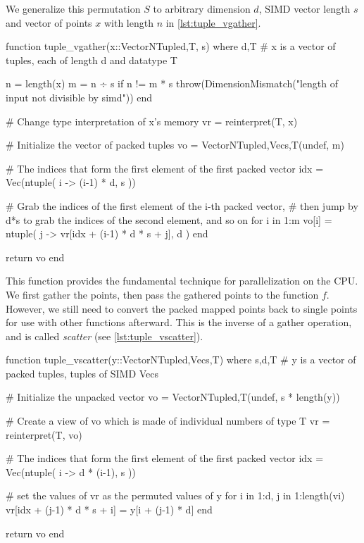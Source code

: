 We generalize this permutation $S$ to arbitrary dimension $d$, SIMD vector length $s$ and 
vector of points $x$ with length $n$ in \autoref{lst:tuple_vgather}. \\

\begin{jllisting}[float, floatplacement=ht!, language=julia, style=jlcodestyle, label=lst:tuple_vgather, caption=Conversion function to packed tuples]
    function tuple_vgather(x::Vector{NTuple{d,T}}, s) where {d,T}
        # x is a vector of tuples, each of length d and datatype T
    
        n = length(x)                                   
        m = n ÷ s
        if n != m * s
            throw(DimensionMismatch("length of input not divisible by simd"))
        end
    
        # Change type interpretation of x's memory
        vr = reinterpret(T, x)
    
        # Initialize the vector of packed tuples
        vo = Vector{NTuple{d,Vec{s,T}}}(undef, m)
    
        # The indices that form the first element of the first packed vector
        idx = Vec(ntuple( i -> (i-1) * d, s ))
    
        # Grab the indices of the first element of the i-th packed vector, 
        # then jump by d*s to grab the indices of the second element, and so on
        for i in 1:m
            vo[i] = ntuple( j -> vr[idx + (i-1) * d * s + j], d )
        end                                             
        
        return vo
    end
\end{jllisting}

This function provides the fundamental technique for parallelization on the CPU. We first 
gather the points, then pass the gathered points to the function $f$. However, we still 
need to convert the packed mapped points back to single points for use with other 
functions afterward. This is the inverse of a gather operation, and is called 
\emph{scatter} (see \autoref{lst:tuple_vscatter}). \\

\begin{jllisting}[float, floatplacement=ht!, language=julia, style=jlcodestyle, label=lst:tuple_vscatter, caption=Conversion back to single tuples]
    function tuple_vscatter(y::Vector{NTuple{d,Vec{s,T}}}) where {s,d,T}
        # y is a vector of packed tuples, tuples of SIMD Vecs

        # Initialize the unpacked vector
        vo = Vector{NTuple{d,T}}(undef, s * length(y))

        # Create a view of vo which is made of individual numbers of type T 
        vr = reinterpret(T, vo)

        # The indices that form the first element of the first packed vector
        idx = Vec(ntuple( i -> d * (i-1), s ))

        # set the values of vr as the permuted values of y
        for i in 1:d, j in 1:length(vi)
            vr[idx + (j-1) * d * s + i] = y[i + (j-1) * d]
        end

        return vo
    end
\end{jllisting}

